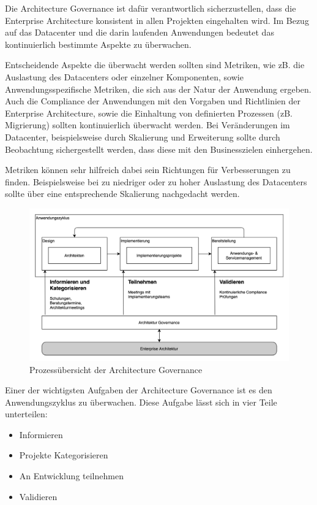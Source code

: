 Die Architecture Governance ist dafür verantwortlich sicherzustellen, dass die Enterprise Architecture konsistent in allen Projekten eingehalten wird. Im Bezug auf das Datacenter und die darin laufenden Anwendungen bedeutet das kontinuierlich bestimmte Aspekte zu überwachen.

Entscheidende Aspekte die überwacht werden sollten sind Metriken, wie zB. die Auslastung des Datacenters oder einzelner Komponenten, sowie Anwendungsspezifische Metriken, die sich aus der Natur der Anwendung ergeben. Auch die Compliance der Anwendungen mit den Vorgaben und Richtlinien der Enterprise Architecture, sowie die Einhaltung von definierten Prozessen (zB. Migrierung) sollten kontinuierlich überwacht werden. Bei Veränderungen im Datacenter, beispielsweise durch Skalierung und Erweiterung sollte durch Beobachtung sichergestellt werden, dass diese mit den Businesszielen einhergehen. 

Metriken können sehr hilfreich dabei sein Richtungen für Verbesserungen zu finden. Beispielsweise bei zu niedriger oder zu hoher Auslastung des Datacenters sollte über eine entsprechende Skalierung nachgedacht werden.

\begin{figure}
	\centering
	\includegraphics[width=\linewidth]{img/governance}
	\caption{Prozessübersicht der Architecture Governance}
	\label{fig:governance}
\end{figure}

Einer der wichtigsten Aufgaben der Architecture Governance ist es den Anwendungszyklus zu überwachen. Diese Aufgabe lässt sich in vier Teile unterteilen:

\begin{itemize}
	\item Informieren
	\item Projekte Kategorisieren
	\item An Entwicklung teilnehmen
	\item Validieren
\end{itemize}


